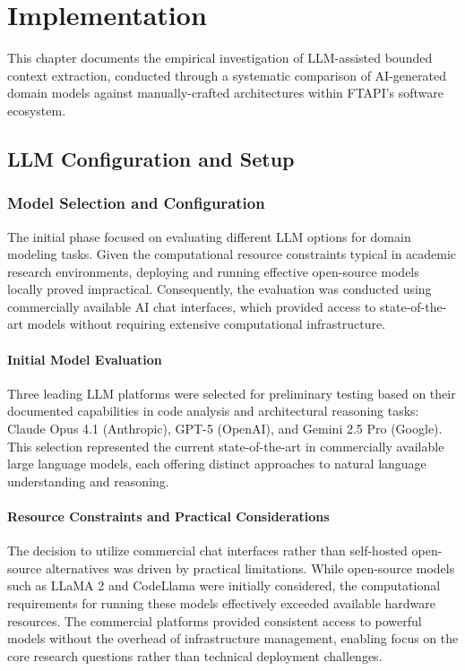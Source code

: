 \chapter{Implementation}\label{chapter:implementation}
This chapter documents the empirical investigation of LLM-assisted bounded context extraction, conducted through a systematic comparison of AI-generated domain models against manually-crafted architectures within FTAPI's software ecosystem.

\section{LLM Configuration and Setup}

\subsection{Model Selection and Configuration}
The initial phase focused on evaluating different LLM options for domain modeling tasks. Given the computational resource constraints typical in academic research environments, deploying and running effective open-source models locally proved impractical. Consequently, the evaluation was conducted using commercially available AI chat interfaces, which provided access to state-of-the-art models without requiring extensive computational infrastructure.

\subsubsection{Initial Model Evaluation}
Three leading LLM platforms were selected for preliminary testing based on their documented capabilities in code analysis and architectural reasoning tasks: Claude Opus 4.1 (Anthropic), GPT-5 (OpenAI), and Gemini 2.5 Pro (Google). This selection represented the current state-of-the-art in commercially available large language models, each offering distinct approaches to natural language understanding and reasoning.

\subsubsection{Resource Constraints and Practical Considerations}
The decision to utilize commercial chat interfaces rather than self-hosted open-source alternatives was driven by practical limitations. While open-source models such as LLaMA 2 and CodeLlama were initially considered, the computational requirements for running these models effectively exceeded available hardware resources. The commercial platforms provided consistent access to powerful models without the overhead of infrastructure management, enabling focus on the core research questions rather than technical deployment challenges.

